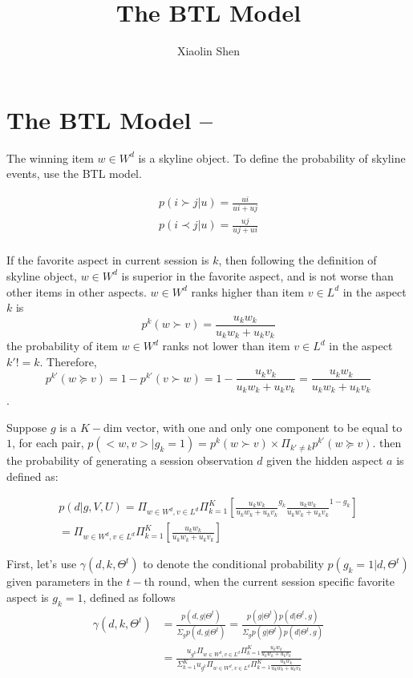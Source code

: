 \documentclass{article}
\title{The BTL Model}
\author{Xiaolin Shen}
\begin{document}
\maketitle


\section{The BTL Model --}
The winning item $w\in W^d$ is a skyline object. To define the probability of skyline events, use the BTL model.

\begin{align*}
	p(i \succ j |u)=\frac{ui}{ui+ uj} \\
	p(i \prec j |u)=\frac{uj}{uj+ ui} \\
\end{align*}

If the favorite aspect in current session is $k$, then following the definition of skyline object, $w\in W^d$ is superior in the favorite aspect,  and is not worse than other items in other aspects. $w\in W^d$ ranks higher than item $v\in L^d$ in the aspect $k$ is
$$p^k(w \succ v)=\frac{u_k w_k}{u_k w_k+u_k v_k}$$
 the probability of item $w\in W^d$ ranks not lower than item $v\in L^d$ in the aspect $k'!=k$. Therefore,
 $$p^{k'}(w \succeq v)=1- p^{k'} (v \succ w) = 1-\frac{u_k v_k}{u_k w_k+u_k v_k}=\frac{u_k w_k}{u_k w_k+u_k v_k}$$.

 Suppose $g$ is a $K-$dim vector, with one and only one component to be equal to $1$, for each pair, $p(<w,v>|g_k=1) = p^k(w\succ v) \times \Pi_{k'\neq k} p^{k'}(w \succeq v)$. then the probability of generating a session observation $d$ given the hidden aspect $a$ is defined as:

\begin{align}\label{equ:skyline}
p(d|g,V,U)
		=\Pi_{w\in W^d, v\in L^d} \Pi_{k=1}^{K}[ {\frac{u_k w_k}{u_k w_k+u_k v_k}}^{g_k} { \frac{u_k w_k}{u_k w_k+u_k v_k}}^{1-g_k}]\\
=\Pi_{w\in W^d, v\in L^d} \Pi_{k=1}^{K}[ {\frac{u_k w_k}{u_k w_k+u_k v_k}}]
\end{align}


First, let's use  $\gamma(d,k,\Theta^t)$ to denote the conditional probability $p(g_k=1|d,\Theta^t)$ given parameters in the $t-$th round, when the current session specific favorite aspect is $g_k=1$, defined as follows
\begin{align}\label{equ:conditional}
\gamma(d,k,\Theta^t) &=\frac{p(d,g|\Theta^t)}{\Sigma_g p(d,g|\Theta^t)} = \frac{p(g|\Theta^t)p(d|\Theta^t,g)}{\Sigma_g p(g|\Theta^t)p(d|\Theta^t,g)}\\\nonumber
&=\frac{u_{g^k} \Pi_{w \in W^d, v\in L^d} \Pi_{k=1}^{K}\frac{u_k w_k}{u_k w_k+u_k v_k}}{\Sigma_{k=1}^K u_{g^k} \Pi_{w \in W^d, v\in L^d} \Pi_{k=1}^{K}\frac{u_k w_k}{u_k w_k+u_k v_k}}
\end{align}
\end{document}
